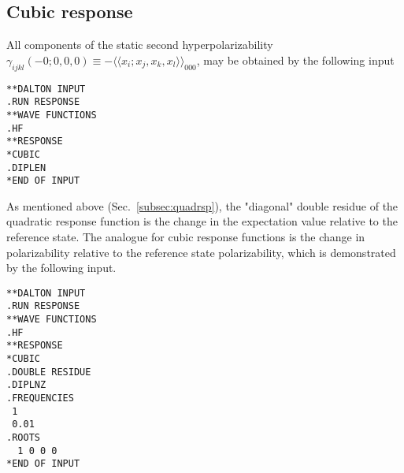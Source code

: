 \subsection{Cubic response}
\label{subsec:cubrsp}

\begin{center}
\end{center}

All components of the static second hyperpolarizability
$\gamma_{ijkl}(-0;0,0,0)\equiv
-\langle\!\langle x_i;x_j,x_k,x_l\rangle\!\rangle_{000}$,
 may be obtained by the following input

\begin{verbatim}
**DALTON INPUT
.RUN RESPONSE
**WAVE FUNCTIONS
.HF
**RESPONSE
*CUBIC
.DIPLEN
*END OF INPUT
\end{verbatim}



As  mentioned above (Sec.~\ref{subsec:quadrsp}), the "diagonal" 
double residue of the quadratic
response function is the change in the expectation value relative to the
reference state. The analogue for cubic
response functions is the change in
polarizability relative to the
reference state polarizability, which is demonstrated by the following
input.
\begin{verbatim}
**DALTON INPUT
.RUN RESPONSE
**WAVE FUNCTIONS
.HF
**RESPONSE
*CUBIC
.DOUBLE RESIDUE
.DIPLNZ
.FREQUENCIES
 1
 0.01
.ROOTS
  1 0 0 0
*END OF INPUT
\end{verbatim}



